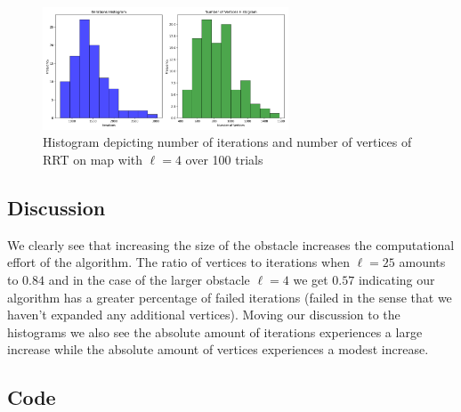 \documentclass{article}
\begin{document}
\begin{figure}[H]
    \begin{center}
        \includegraphics[width=0.65\textwidth]{figures/hist_RRT_2.png}
    \end{center}
    \caption{Histogram depicting number of iterations and number of
    vertices of RRT on map with $\ell=4$ over 100
trials}\label{fig:hist_RRT_2}
\end{figure}

\subsection{Discussion}\label{sub:Discussion} %
We clearly see that increasing the size of the obstacle increases the
computational effort of the algorithm. The ratio of vertices to iterations
when $\ell=25$ amounts to $0.84$ and in the case of the larger obstacle
$\ell=4$ we get $0.57$ indicating our algorithm has a greater percentage
of failed iterations (failed in the sense that we haven't expanded any
additional vertices). Moving our discussion to the histograms we also see the 
absolute amount of iterations experiences a large increase while the absolute 
amount of vertices experiences a modest increase.

\subsection{Code}\label{sub:Code} %
\end{document}
